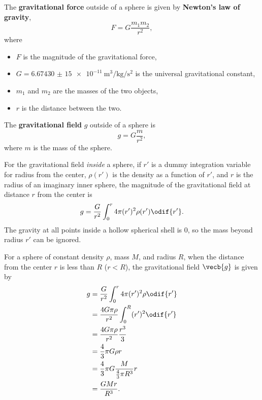 The \textbf{gravitational force} outside of a sphere is given by
\textbf{Newton's law of gravity},
\begin{equation} \label{eq:newtons-law-of-gravity}
    F = G \frac{m_1 m_2}{r^2},
\end{equation}
where
\begin{itemize}
    \item \(F\) is the magnitude of the gravitational force,
    \item \(G = \qty{6.674 30(15)e-11}{\metre\cubed \per \kilogram \per
        \second\squared}\)
        is the universal gravitational constant, \autocite{nist-G}
    \item \(m_1\) and \(m_2\) are the masses of the two objects,
    \item \(r\) is the distance between the two.
\end{itemize}

The \textbf{gravitational field} \(g\) outside of a sphere is
\begin{equation}
    g = G \frac{m}{r^2},
\end{equation}
where \(m\) is the mass of the sphere.

For the gravitational field \emph{inside} a sphere,
if \(r'\) is a dummy integration variable for radius from the center,
\(\rho(r')\) is the density as a function of \(r'\),
and \(r\) is the radius of an imaginary inner sphere,
the magnitude of the gravitational field at distance \(r\)
from the center is
\begin{equation}
    g = \frac{G}{r^2}
    \int_{0}^{r} 4\pi (r')^2 \rho(r') \odif{r'}.
\end{equation}
The gravity at all points inside a hollow spherical shell is 0,
so the mass beyond radius \(r'\) can be ignored.

For a sphere of constant density \(\rho\), mass \(M\),
and radius \(R\),
when the distance from the center \(r\) is less than \(R\) (\(r < R\)),
the gravitational field \(\vecb{g}\) is given by
\begin{equation}
    \begin{aligned}
        g &= \frac{G}{r^2} \int_{0}^{r} 4\pi
        (r')^2 \rho \odif{r'} \\
        &= \frac{4 G \pi \rho}{r^2}
        \int_{0}^{R} (r')^2 \odif{r'} \\
        &= \frac{4 G \pi \rho}{r^2} \frac{r^3}{3} \\
        &= \frac{4}{3} \pi G \rho r \\
        &= \frac{4}{3} \pi G \frac{M}{\frac{4}{3} \pi R^3} r \\
        &= \frac{G M r}{R^3}.
    \end{aligned}
\end{equation}

